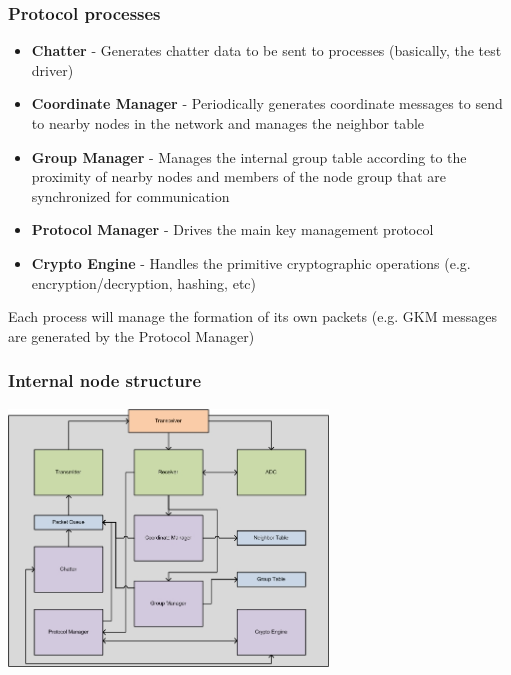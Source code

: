 \documentclass[handout]{beamer}
\begin{document}
\begin{frame}
 \frametitle{Protocol processes}
 \begin{itemize}
  \item \textbf{Chatter} - Generates chatter data to be sent to processes (basically, the test driver)
  \item \textbf{Coordinate Manager} - Periodically generates coordinate messages to send to nearby nodes in the network and manages the neighbor table
  \item \textbf{Group Manager} - Manages the internal group table according to the proximity of nearby nodes
and members of the node group that are synchronized for communication
  \item \textbf{Protocol Manager} - Drives the main key management protocol
  \item \textbf{Crypto Engine} - Handles the primitive cryptographic operations (e.g. encryption/decryption, hashing, etc)
 \end{itemize}

Each process will manage the formation of its own packets (e.g. GKM messages are generated by the Protocol Manager)
\end{frame}

\begin{frame}
 \frametitle{Internal node structure}
 \begin{center}
  \includegraphics[width=85mm]{dynamic_node.jpg}
 \end{center}
\end{frame}

\end{document}
